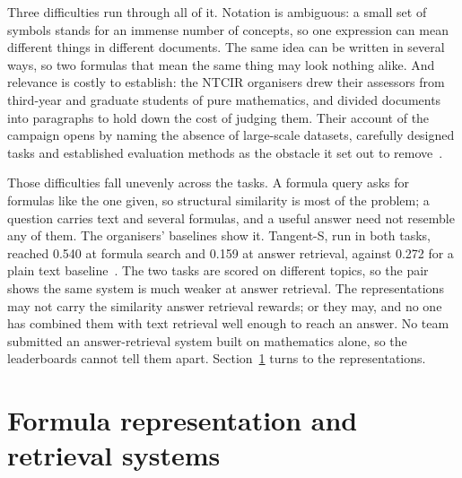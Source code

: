 Three difficulties run through all of it. Notation is ambiguous: a small set of symbols
stands for an immense number of concepts, so one expression can mean different things in
different documents. The same idea can be written in several ways, so two formulas that
mean the same thing may look nothing alike. And relevance is costly to establish: the
NTCIR organisers drew their assessors from third-year and graduate students of pure
mathematics, and divided documents into paragraphs to hold down the cost of judging
them. Their account of the campaign opens by naming the absence of large-scale
datasets, carefully designed tasks and established evaluation methods as the obstacle
it set out to remove~\cite{aizawa2020ntcirmath}.

Those difficulties fall unevenly across the tasks. A formula query asks for formulas
like the one given, so structural similarity is most of the problem; a question carries
text and several formulas, and a useful answer need not resemble any of them. The
organisers' baselines show it. Tangent-S, run in both tasks, reached 0.540 at formula
search and 0.159 at answer retrieval, against 0.272 for a plain text
baseline~\cite{mansouri2022arqmath3}. The two tasks are scored on different topics, so
the pair shows the same system is much weaker at answer retrieval. The representations
may not carry the similarity answer retrieval rewards; or they may, and no one has
combined them with text retrieval well enough to reach an answer. No team submitted an
answer-retrieval system built on mathematics alone, so the leaderboards cannot tell them
apart. Section~\ref{sec:rw-formula-systems} turns to the representations.


\section{Formula representation and retrieval systems}\label{sec:rw-formula-systems}

